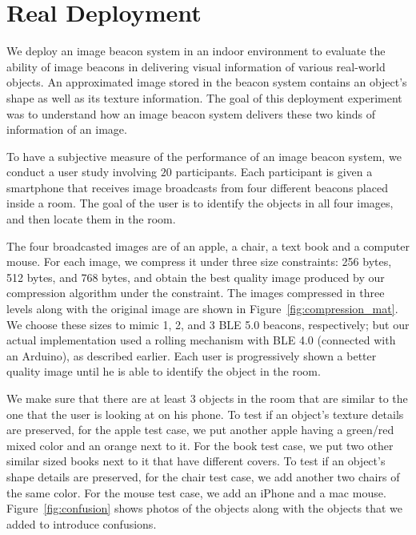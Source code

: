 \section{Real Deployment}
\label{sec:deployment}

We deploy an image beacon system in an indoor environment to evaluate the ability of image beacons in delivering visual information of various real-world objects. An approximated image stored in the beacon system contains an object's shape as well as its texture information. The goal of this deployment experiment was to understand how an image beacon system delivers these two kinds of information of an image.

To have a subjective measure of the performance of an image beacon system, we conduct a user study involving $20$ participants. Each participant is given a smartphone that receives image broadcasts from four different beacons placed inside a room. The goal of the user is to identify the objects in all four images, and then locate them in the room.


The four broadcasted images are of an apple, a chair, a text book and a computer mouse. For each image, we compress it under three size constraints: 256 bytes, 512 bytes, and 768 bytes, and obtain the best quality image produced by our compression algorithm under the constraint. The images compressed in three levels along with the original image are shown in Figure~\ref{fig:compression_mat}. We choose these sizes to mimic 1, 2, and 3 BLE 5.0 beacons, respectively; but our actual implementation used a rolling mechanism with BLE 4.0 (connected with an Arduino), as described earlier. Each user is progressively shown a better quality image until he is able to identify the object in the room.

We make sure that there are at least 3 objects in the room that are similar to the one that the user is looking at on his phone. To test if an object's texture details are preserved, for the apple test case, we put another apple having a green/red mixed color and an orange next to it. For the book test case, we put two other similar sized books next to it that have different covers. To test if an object's shape details are preserved, for the chair test case, we add another two chairs of the same color. For the mouse test case, we add an iPhone and a mac mouse. Figure~\ref{fig:confusion} shows photos of the objects along with the objects that we added to introduce confusions.

